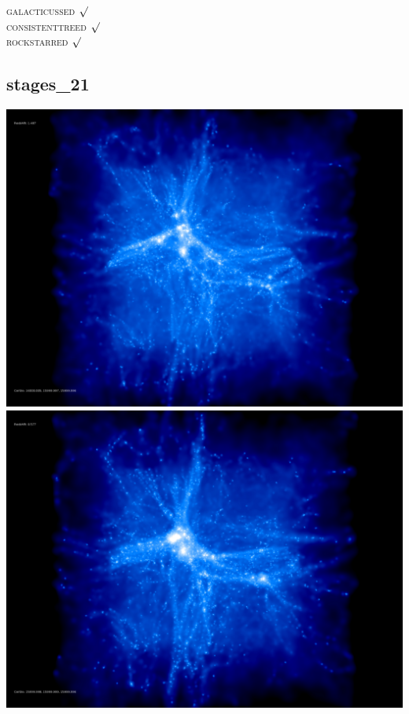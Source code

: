 \textsc{galacticussed} $\surd$ \\
\textsc{consistenttreed} $\surd$ \\ 
\textsc{rockstarred} $\surd$

% 
%
%
%
%
%
%
%


\newpage
\subsection{stages\_21}

\includegraphics[scale=0.1]{r256/stages_21/50.jpg} 
\includegraphics[scale=0.1]{r256/stages_21/100.jpg}  \\

